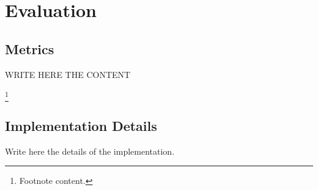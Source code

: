 
\chapter{Evaluation}\label{ch:evaluation}

\bigskip 
\bigskip




\bigskip

\section{Metrics}

\bigskip

WRITE HERE THE CONTENT

\bigskip 

\bigskip



\bigskip 

\bigskip

\footnote{ Footnote content.}



\bigskip
\begin{comment}
\section{Name of the section}

bla
bla
bla

\end{comment}
\bigskip
\bigskip
\bigskip

\section{Implementation Details}


Write here the details of the implementation.


\bigskip
\bigskip
\bigskip



